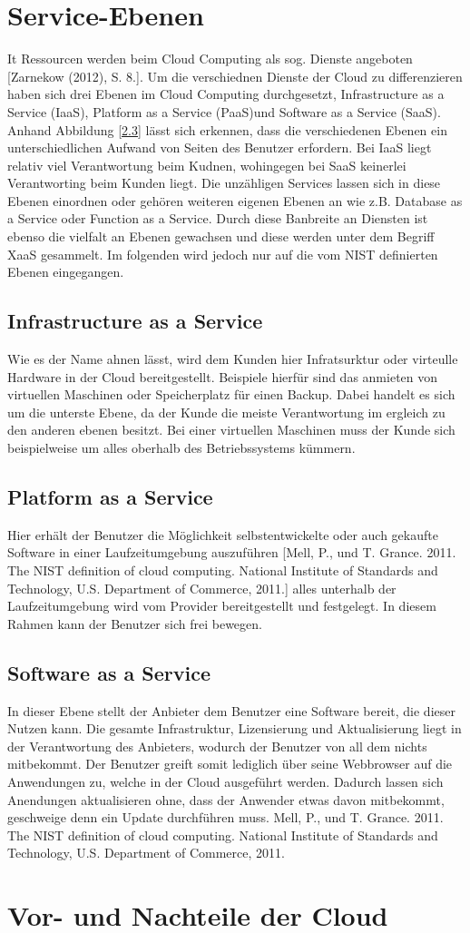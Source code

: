 \section{Service-Ebenen}
It Ressourcen werden beim Cloud Computing als sog. Dienste angeboten [Zarnekow (2012), S. 8.]. Um die verschiednen Dienste der Cloud zu differenzieren haben sich drei Ebenen im Cloud Computing durchgesetzt, Infrastructure as a Service (IaaS), Platform as a Service (PaaS)und Software as a Service (SaaS). Anhand Abbildung \ref{2.3} lässt sich erkennen, dass die verschiedenen Ebenen ein unterschiedlichen Aufwand von Seiten des Benutzer erfordern. Bei IaaS liegt relativ viel Verantwortung beim Kudnen, wohingegen bei SaaS keinerlei Verantworting beim Kunden liegt. Die unzähligen Services lassen sich in diese Ebenen einordnen oder gehören weiteren eigenen Ebenen an wie z.B. Database as a Service oder Function as a Service. Durch diese Banbreite an Diensten ist ebenso die vielfalt an Ebenen gewachsen und diese werden unter dem Begriff XaaS gesammelt. Im folgenden wird jedoch nur auf die vom NIST definierten Ebenen eingegangen.
\subsection{Infrastructure as a Service}
Wie es der Name ahnen lässt, wird dem Kunden hier Infratsurktur oder virteulle Hardware in der Cloud bereitgestellt. Beispiele hierfür sind das anmieten von virtuellen Maschinen oder Speicherplatz für einen Backup. Dabei handelt es sich um die unterste Ebene, da der Kunde die meiste Verantwortung im ergleich zu den anderen ebenen besitzt. Bei einer virtuellen Maschinen muss der Kunde sich beispielweise um alles oberhalb des Betriebssystems kümmern. 
\subsection{Platform as a Service}
Hier erhält der Benutzer die Möglichkeit selbstentwickelte oder auch gekaufte Software in einer Laufzeitumgebung auszuführen [Mell, P., und T. Grance. 2011. The NIST definition of cloud computing. National Institute of Standards and Technology, U.S. Department of Commerce, 2011.] alles unterhalb der Laufzeitumgebung wird vom Provider bereitgestellt und festgelegt. In diesem Rahmen kann der Benutzer sich frei bewegen.
\subsection{Software as a Service}
In dieser Ebene stellt der Anbieter dem Benutzer eine Software bereit, die dieser Nutzen kann. Die gesamte Infrastruktur, Lizensierung und Aktualisierung liegt in der Verantwortung des Anbieters, wodurch der Benutzer von all dem nichts mitbekommt. Der Benutzer greift somit lediglich über seine Webbrowser auf die Anwendungen zu, welche in der Cloud ausgeführt werden. Dadurch lassen sich Anendungen aktualisieren ohne, dass der Anwender etwas davon mitbekommt, geschweige denn ein Update durchführen muss. Mell, P., und T. Grance. 2011. The NIST definition of cloud computing. National Institute of Standards and Technology, U.S. Department of Commerce, 2011.
\section{Vor- und Nachteile der Cloud}